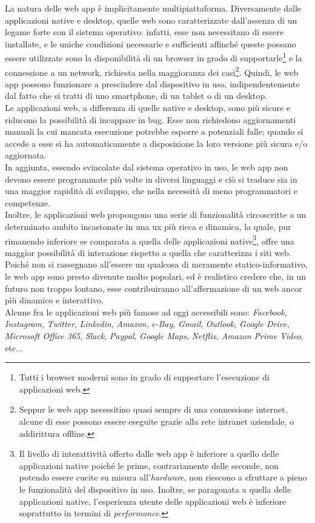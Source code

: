 La natura delle web app è implicitamente multipiattaforma. Diversamente dalle applicazioni native e desktop, quelle web sono caratterizzate dall'assenza di un legame forte con il sistema operativo: infatti, esse non necessitano di essere installate, e le uniche condizioni necessarie e sufficienti affinché queste possano essere utilizzate sono la disponibilità di un browser in grado di supportarle\footnote{Tutti i browser moderni sono in grado di supportare l'esecuzione di applicazioni web.} e la connessione a un network, richiesta nella maggioranza dei casi\footnote{Seppur le web app necessitino quasi sempre di una connessione internet, alcune di esse possono essere eseguite grazie alla rete intranet aziendale, o addirittura offline.}. Quindi, le web app possono funzionare a prescindere dal dispositivo in uso, indipendentemente dal fatto che si tratti di uno smartphone, di un tablet o di un desktop.\\
Le applicazioni web, a differenza di quelle native e desktop, sono più sicure e riducono la possibilità di incappare in bug. Esse non richiedono aggiornamenti manuali la cui mancata esecuzione potrebbe esporre a potenziali falle; quando si accede a esse si ha automaticamente a disposizione la loro versione più sicura e/o aggiornata.\\
In aggiunta, essendo svincolate dal sistema operativo in uso, le web app non devono essere programmate più volte in diversi linguaggi e ciò si traduce sia in una maggior rapidità di sviluppo, che nella necessità di meno programmatori e competenze.\\
Inoltre, le applicazioni web propongono una serie di funzionalità circoscritte a un determinato ambito incastonate in una \gls{ux} più ricca e dinamica, la quale, pur rimanendo inferiore se comparata a quella delle applicazioni native\footnote{Il livello di interattività offerto dalle web app è inferiore a quello delle applicazioni native poiché le prime, contrariamente delle seconde, non potendo essere cucite su misura all'\textit{hardware}, non riescono a sfruttare a pieno le funzionalità del dispositivo in uso. Inoltre, se paragonata a quella delle applicazioni native, l'esperienza utente delle applicazioni web è inferiore soprattutto in termini di \textit{performance}.}, offre una maggior possibilità di interazione rispetto a quella che caratterizza i siti web.\\
Poiché non si rassegnano all'essere un qualcosa di meramente statico-informativo, le web app sono presto divenute molto popolari, ed è realistico credere che, in un futuro non troppo lontano, esse contribuiranno all'affermazione di un web ancor più dinamico e interattivo.\\
Alcune fra le applicazioni web più famose ad oggi accessibili sono: \textit{Facebook}, \textit{Instagram}, \textit{Twitter}, \textit{Linkedin}, \textit{Amazon}, \textit{e-Bay}, \textit{Gmail}, \textit{Outlook}, \textit{Google Drive}, \textit{Microsoft Office 365}, \textit{Slack}, \textit{Paypal}, \textit{Google Maps}, \textit{Netflix}, \textit{Amazon Prime Video}, etc...

